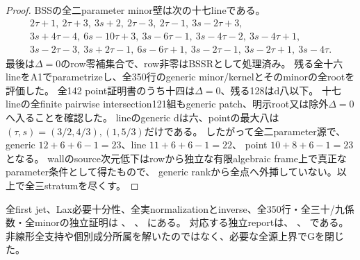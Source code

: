 \documentclass[a4paper,11pt]{ltjsarticle}
\theoremstyle{definition}
\begin{document}
\begin{proof}
BSSの全二parameter minor壁は次の十七lineである。
\[
\begin{gathered}
 2\tau+1,\ 2\tau+3,\ 3s+2,\ 2\tau-3,\ 2\tau-1,\ 3s-2\tau+3,\\
 3s+4\tau-4,\ 6s-10\tau+3,\ 3s-6\tau-1,\ 3s-4\tau-2,\ 3s-4\tau+1,\\
 3s-2\tau-3,\ 3s+2\tau-1,\ 6s-6\tau+1,\ 3s-2\tau-1,\ 3s-2\tau+1,\ 3s-4\tau.
\end{gathered}
\]
最後は$\Delta=0$のrow零補集合で、row非零はBSSRとして処理済み。
残る全十六lineをA1でparametrizeし、全350行のgeneric minor/kernelとそのminorの全rootを評価した。
全142 point証明書のうち十四は$\Delta=0$、残る128はd八以下。
十七lineの全finite pairwise intersection121組もgeneric patch、明示root又は除外$\Delta=0$へ入ることを確認した。
lineのgeneric dは六、pointの最大八は$(\tau,s)=(3/2,4/3),(1,5/3)$だけである。
したがって全二parameter源で、generic $12+6+6-1=23$、line $11+6+6-1=22$、
point $10+8+6-1=23$となる。
wallのsource次元低下はrowから独立な有限algebraic frame上で真正なparameter条件として得たもので、
generic rankから全点へ外挿していない。以上で全三stratumを尽くす。
\end{proof}
全first jet、Lax必要十分性、全実normalizationとinverse、全350行・全三十/九係数・全minorの独立証明は
、
、
にある。
対応する独立reportは、
、
である。
非線形全支持や個別成分所属を解いたのではなく、必要な全源上界でGを閉じた。
\end{document}
